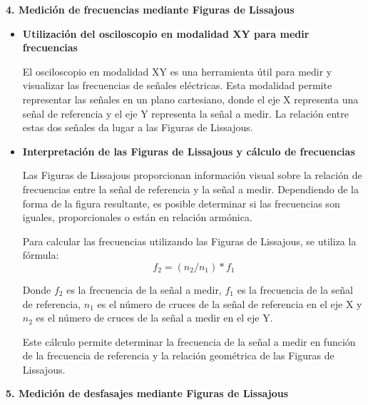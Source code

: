 \documentclass[12pt]{article}
\begin{document}
	\textbf{4. Medición de frecuencias mediante Figuras de Lissajous}
	
	\begin{itemize}
		\item \textbf{Utilización del osciloscopio en modalidad XY para medir frecuencias}
		
		El osciloscopio en modalidad XY es una herramienta útil para medir y visualizar las frecuencias de señales eléctricas. Esta modalidad permite representar las señales en un plano cartesiano, donde el eje X representa una señal de referencia y el eje Y representa la señal a medir. La relación entre estas dos señales da lugar a las Figuras de Lissajous.
		
		\item \textbf{Interpretación de las Figuras de Lissajous y cálculo de frecuencias}
		
		Las Figuras de Lissajous proporcionan información visual sobre la relación de frecuencias entre la señal de referencia y la señal a medir. Dependiendo de la forma de la figura resultante, es posible determinar si las frecuencias son iguales, proporcionales o están en relación armónica.
		
		Para calcular las frecuencias utilizando las Figuras de Lissajous, se utiliza la fórmula: $$f_{2} = (n_{2}/n_{1}) * f_{1}$$
		
		Donde $f_{2}$ es la frecuencia de la señal a medir, $f_{1}$ es la frecuencia de la señal de referencia, $n_{1}$ es el número de cruces de la señal de referencia en el eje X y $n_{2}$ es el número de cruces de la señal a medir en el eje Y.
		
		Este cálculo permite determinar la frecuencia de la señal a medir en función de la frecuencia de referencia y la relación geométrica de las Figuras de Lissajous.
		
	\end{itemize}
	
	
	\textbf{5. Medición de desfasajes mediante Figuras de Lissajous}
	
\end{document}
